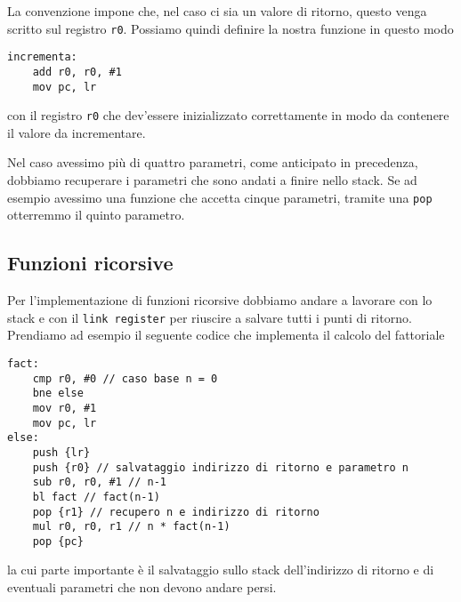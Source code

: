 La convenzione impone che, nel caso ci sia un valore di ritorno, questo venga scritto sul registro
\verb|r0|. Possiamo quindi definire la nostra funzione in questo modo
\begin{verbatim}
incrementa:
	add r0, r0, #1
	mov pc, lr
\end{verbatim}
con il registro \verb|r0| che dev'essere inizializzato correttamente in modo da contenere il valore
da incrementare.

Nel caso avessimo più di quattro parametri, come anticipato in precedenza, dobbiamo recuperare i
parametri che sono andati a finire nello stack. Se ad esempio avessimo una funzione che accetta
cinque parametri, tramite una \verb|pop| otterremmo il quinto parametro.

\subsection{Funzioni ricorsive}
Per l'implementazione di funzioni ricorsive dobbiamo andare a lavorare con lo stack e con il
\verb|link register| per riuscire a salvare tutti i punti di ritorno. Prendiamo ad esempio il
seguente codice che implementa il calcolo del fattoriale
\begin{verbatim}
fact:
	cmp r0, #0 // caso base n = 0
	bne else
	mov r0, #1
	mov pc, lr
else:
	push {lr}
	push {r0} // salvataggio indirizzo di ritorno e parametro n
	sub r0, r0, #1 // n-1
	bl fact // fact(n-1)
	pop {r1} // recupero n e indirizzo di ritorno
	mul r0, r0, r1 // n * fact(n-1)
	pop {pc}
\end{verbatim}
la cui parte importante è il salvataggio sullo stack dell'indirizzo di ritorno e di eventuali
parametri che non devono andare persi.
